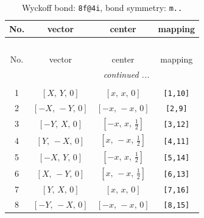 \documentclass[fleqn,8pt]{jsarticle}
\begin{document}
\begin{longtable}{cccc}
\caption{Wyckoff bond: {\tt 8f@4i}, bond symmetry: {\tt m..}}
 \\
 \hline \hline
No. & vector & center & mapping \\ \hline \endfirsthead

\multicolumn{3}{l}{\tablename\ \thetable{}} \\
 \hline \hline
No. & vector & center & mapping \\ \hline \endhead

 \hline \hline
\multicolumn{3}{r}{\footnotesize\it continued ...} \\ \endfoot

 \hline \hline
\multicolumn{3}{r}{} \\ \endlastfoot

1 & $\left[ X,\, Y,\, 0 \right]$ & $\left[ x,\, x,\, 0 \right]$ & {\tt [1,10]} \\ \hline
2 & $\left[ - X,\, - Y,\, 0 \right]$ & $\left[ - x,\, - x,\, 0 \right]$ & {\tt [2,9]} \\ \hline
3 & $\left[ - Y,\, X,\, 0 \right]$ & $\left[ - x,\, x,\, \frac{1}{2} \right]$ & {\tt [3,12]} \\ \hline
4 & $\left[ Y,\, - X,\, 0 \right]$ & $\left[ x,\, - x,\, \frac{1}{2} \right]$ & {\tt [4,11]} \\ \hline
5 & $\left[ - X,\, Y,\, 0 \right]$ & $\left[ - x,\, x,\, \frac{1}{2} \right]$ & {\tt [5,14]} \\ \hline
6 & $\left[ X,\, - Y,\, 0 \right]$ & $\left[ x,\, - x,\, \frac{1}{2} \right]$ & {\tt [6,13]} \\ \hline
7 & $\left[ Y,\, X,\, 0 \right]$ & $\left[ x,\, x,\, 0 \right]$ & {\tt [7,16]} \\ \hline
8 & $\left[ - Y,\, - X,\, 0 \right]$ & $\left[ - x,\, - x,\, 0 \right]$ & {\tt [8,15]} \\
\end{longtable}
\renewcommand{\arraystretch}{1.2}
\end{document}
